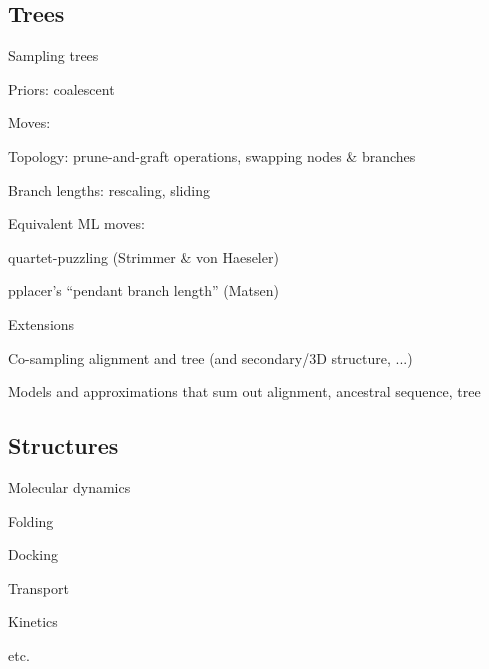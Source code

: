 \documentclass{beamer}
\begin{document}
% 
% 


\subsection{Trees}

\begin{frame}{Sampling trees}

\itemb
\item Priors: coalescent
\item Moves:
\itemb
\item Topology: prune-and-graft operations, swapping nodes \& branches
\item Branch lengths: rescaling, sliding
\iteme
\item Equivalent ML moves:
\itemb
\item quartet-puzzling (Strimmer \& von Haeseler)
\item pplacer's ``pendant branch length'' (Matsen)
\iteme
\iteme

\end{frame}

\begin{frame}{Extensions}

\itemb
\item Co-sampling alignment and tree (and secondary/3D structure, ...)
\item Models and approximations that sum out alignment, ancestral sequence, tree
\iteme

\end{frame}


\subsection{Structures}

\begin{frame}{Molecular dynamics}

\itemb
\item Folding
\item Docking
\item Transport
\item Kinetics
\item etc.
\iteme

\end{frame}
\end{document}
